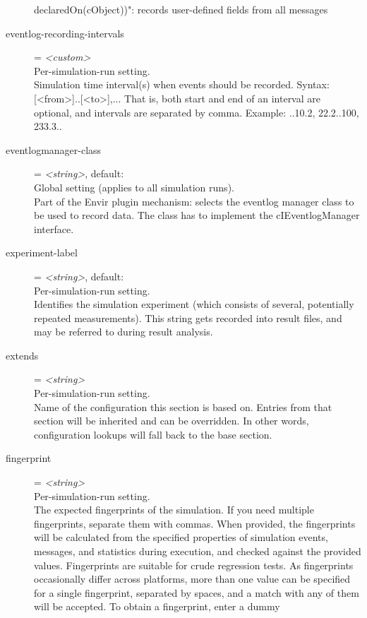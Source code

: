 \begin{description}
    declaredOn(cObject))": records user-defined fields from all messages
\item[eventlog-recording-intervals] = \textit{<custom>}\\
    Per-simulation-run setting.\\
    Simulation time interval(s) when events should be recorded. Syntax:
    [<from>]..[<to>],... That is, both start and end of an interval are
    optional, and intervals are separated by comma. Example: ..10.2, 22.2..100,
    233.3..
\item[eventlogmanager-class] = \textit{<string>}, default: \\
    Global setting (applies to all simulation runs).\\
    Part of the Envir plugin mechanism: selects the eventlog manager class to
    be used to record data. The class has to implement the cIEventlogManager
    interface.
\item[experiment-label] = \textit{<string>}, default: \\
    Per-simulation-run setting.\\
    Identifies the simulation experiment (which consists of several,
    potentially repeated measurements). This string gets recorded into result
    files, and may be referred to during result analysis.
\item[extends] = \textit{<string>}\\
    Per-simulation-run setting.\\
    Name of the configuration this section is based on. Entries from that
    section will be inherited and can be overridden. In other words,
    configuration lookups will fall back to the base section.
\item[fingerprint] = \textit{<string>}\\
    Per-simulation-run setting.\\
    The expected fingerprints of the simulation. If you need multiple
    fingerprints, separate them with commas. When provided, the fingerprints
    will be calculated from the specified properties of simulation events,
    messages, and statistics during execution, and checked against the provided
    values. Fingerprints are suitable for crude regression tests. As
    fingerprints occasionally differ across platforms, more than one value can
    be specified for a single fingerprint, separated by spaces, and a match
    with any of them will be accepted. To obtain a fingerprint, enter a dummy

\end{description}
